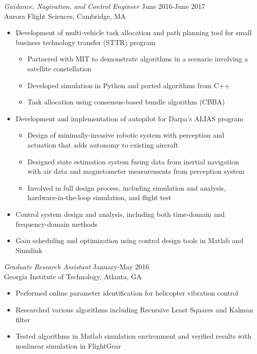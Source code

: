\documentclass[margin]{resume} %
\begin{document}
\begin{resume}
{\sl Guidance, Nagivation, and Control Engineer} \hfill June 2016-June 2017 \\
Aurora Flight Sciences, Cambridge, MA
\begin{itemize} \itemsep -2pt %
\item Development of multi-vehicle task allocation and path planning tool for small business technology transfer (STTR) program
\vspace{-2mm}
	\begin{itemize}
	\item Partnered with MIT to demonstrate algorithms in a scenario involving a satellite constellation
	\item Developed simulation in Python and ported algorithms from C++
	\item Task allocation using consensus-based bundle algorithm (CBBA)
	\end{itemize}
\item Development and implementation of autopilot for Darpa's ALIAS program
\vspace{-2mm}
	\begin{itemize}
	\item Design of minimally-invasive robotic system with perception and actuation that adds autonomy to existing aircraft
	\item Designed state estimation system fusing data from inertial navigation with air data and magnetometer measurements from perception system
	\item Involved in full design process, including simulation and analysis, hardware-in-the-loop simulation, and flight test
	\end{itemize}
\item Control system design and analysis, including both time-domain and frequency-domain methods
\item Gain scheduling and optimization using control design tools in Matlab and Simulink
\end{itemize} 

{\sl Graduate Research Assistant} \hfill January-May 2016\\
Georgia Institute of Technology, Atlanta, GA
\begin{itemize} \itemsep -2pt %
\item Performed online parameter identification for helicopter vibration control
\item Researched various algorithms including Recursive Least Squares and Kalman filter
\item Tested algorithms in Matlab simulation environment and verified results with nonlinear simulation in FlightGear
\end{itemize} 


\end{resume}
\end{document}
